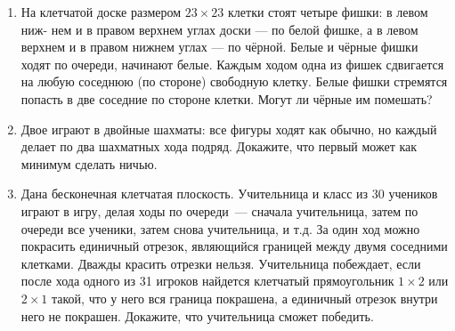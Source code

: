 \documentclass{article}
\begin{document}
\begin{enumerate}[label*=\protect\fbox{\arabic{enumi}}]
\item На клетчатой доске размером $23 \times 23$ клетки стоят четыре фишки: в левом ниж- нем и в правом верхнем углах доски — по белой фишке, а в левом верхнем и в правом нижнем углах — по чёрной. Белые и чёрные фишки ходят по очереди, начинают белые. Каждым ходом одна из фишек сдвигается на любую соседнюю (по стороне) свободную клетку. Белые фишки стремятся попасть в две соседние по стороне клетки. Могут ли чёрные им помешать?

\item Двое играют в двойные шахматы: все фигуры ходят как обычно, но каждый делает по два шахматных хода подряд. Докажите, что первый может как минимум сделать ничью.

\item Дана бесконечная клетчатая плоскость. Учительница и класс из 30 учеников играют в игру, делая ходы по очереди~--- сначала учительница, затем по очереди все ученики, затем снова учительница, и т.д. За один ход можно покрасить единичный отрезок, являющийся границей между двумя соседними клетками. Дважды красить отрезки нельзя. Учительница побеждает, если после хода одного из 31 игроков найдется клетчатый прямоугольник $1 \times 2$ или $2 \times 1$ такой, что у него вся граница покрашена, а единичный отрезок внутри него не покрашен. Докажите, что учительница сможет победить.


\end{enumerate}
\end{document}
